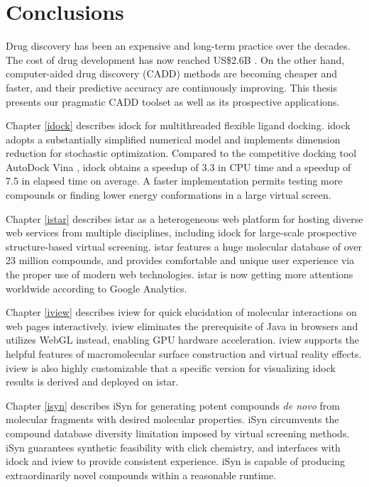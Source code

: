 \chapter{Conclusions}

Drug discovery has been an expensive and long-term practice over the decades. The cost of drug development has now reached US\$2.6B \citep{1611}. On the other hand, computer-aided drug discovery (CADD) methods are becoming cheaper and faster, and their predictive accuracy are continuously improving. This thesis presents our pragmatic CADD toolset as well as its prospective applications.

Chapter \ref{idock} describes idock \citep{1153} for multithreaded flexible ligand docking. idock adopts a substantially simplified numerical model and implements dimension reduction for stochastic optimization. Compared to the competitive docking tool AutoDock Vina \citep{595}, idock obtains a speedup of 3.3 in CPU time and a speedup of 7.5 in elapsed time on average. A faster implementation permits testing more compounds or finding lower energy conformations in a large virtual screen.

Chapter \ref{istar} describes istar \citep{1362} as a heterogeneous web platform for hosting diverse web services from multiple disciplines, including idock for large-scale prospective structure-based virtual screening. istar features a huge molecular database of over 23 million compounds, and provides comfortable and unique user experience via the proper use of modern web technologies. istar is now getting more attentions worldwide according to Google Analytics.

Chapter \ref{iview} describes iview \citep{1366} for quick elucidation of molecular interactions on web pages interactively. iview eliminates the prerequisite of Java in browsers and utilizes WebGL instead, enabling GPU hardware acceleration. iview supports the helpful features of macromolecular surface construction and virtual reality effects. iview is also highly customizable that a specific version for visualizing idock results is derived and deployed on istar.

Chapter \ref{isyn} describes iSyn \citep{1409,1387} for generating potent compounds \textit{de novo} from molecular fragments with desired molecular properties. iSyn circumvents the compound database diversity limitation imposed by virtual screening methods. iSyn guarantees synthetic feasibility with click chemistry, and interfaces with idock and iview to provide consistent experience. iSyn is capable of producing extraordinarily novel compounds within a reasonable runtime.

